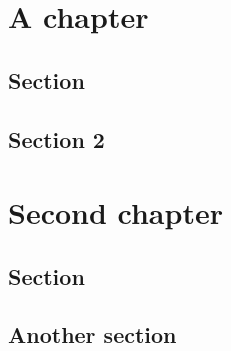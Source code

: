 \documentclass[oneside]{memoir}
\begin{document}
	\tableofcontents
	\chapter{A chapter}
	\startcontents[chapters]
	\section{Section}
	\lipsum[1]
	\section{Section 2}
	\lipsum
	\chapter{Second chapter}
	\startcontents[chapters]
	\section{Section}
	\lipsum[2]
	\section{Another section}
	\lipsum
\end{document}
